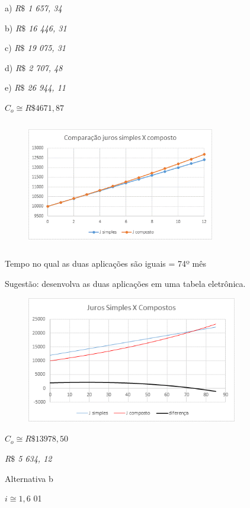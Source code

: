 \begin{respostas}{4}
\ansitem{} a) \textit{R$\$$  1 657, 34}

 b) \textit{R$\$$  16 446, 31}

 c) \textit{R$\$$  19 075, 31}

 d) \textit{R$\$$  2 707, 48}

 e) \textit{R$\$$  26 944, 11}

\ansitem{} \( C_{o} \cong  R\$ 4 671, 87 \) 

\begin{figure}[H]
    \ansitem{}

	\begin{Center}
		\includegraphics[width=3.23in,height=2.2in]{capitulos/potencias_e_funcoes_exponenciais/media/image41.png}
	\end{Center}
\end{figure}

\ansitem{} Tempo no qual as duas aplicações são iguais = 74º mês

Sugestão: desenvolva as duas aplicações em uma tabela eletrônica.

\begin{figure}[H]
	\begin{Center}
		\includegraphics[width=3.62in,height=2.18in]{capitulos/potencias_e_funcoes_exponenciais/media/image42.png}
	\end{Center}
\end{figure}

\ansitem{}  \( C_{o} \cong  R\$ 13 978, 50 \) 

\ansitem{} \textit{R$\$$  5 634, 12}

\ansitem{} Alternativa b

\ansitem{}  \( i \cong 1,6 \) 01
\end{respostas}